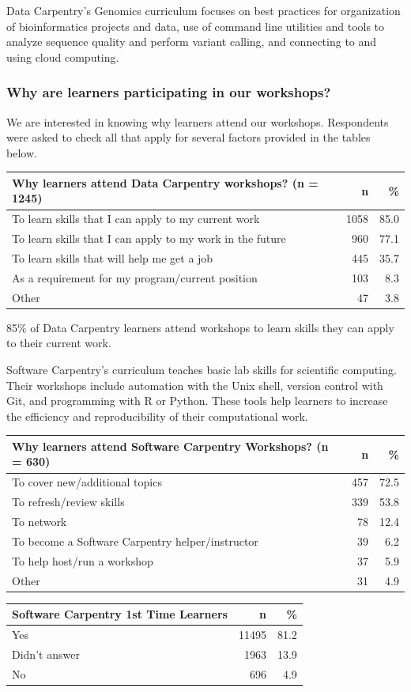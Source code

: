\documentclass[]{article}
\begin{document}
Data Carpentry's Genomics curriculum focuses on best practices for
organization of bioinformatics projects and data, use of command line
utilities and tools to analyze sequence quality and perform variant
calling, and connecting to and using cloud computing.

\subsubsection{Why are learners participating in our
workshops?}\label{why-are-learners-participating-in-our-workshops}

We are interested in knowing why learners attend our workshops.
Respondents were asked to check all that apply for several factors
provided in the tables below.

\begin{longtable}[]{@{}lrr@{}}
\toprule
Why learners attend Data Carpentry workshops? (n = 1245) & n &
\%\tabularnewline
\midrule
\endhead
To learn skills that I can apply to my current work & 1058 &
85.0\tabularnewline
To learn skills that I can apply to my work in the future & 960 &
77.1\tabularnewline
To learn skills that will help me get a job & 445 & 35.7\tabularnewline
As a requirement for my program/current position & 103 &
8.3\tabularnewline
Other & 47 & 3.8\tabularnewline
\bottomrule
\end{longtable}

85\% of Data Carpentry learners attend workshops to learn skills they
can apply to their current work.

Software Carpentry's curriculum teaches basic lab skills for scientific
computing. Their workshops include automation with the Unix shell,
version control with Git, and programming with R or Python. These tools
help learners to increase the efficiency and reproducibility of their
computational work.

\begin{longtable}[]{@{}lrr@{}}
\toprule
Why learners attend Software Carpentry Workshops? (n = 630) & n &
\%\tabularnewline
\midrule
\endhead
To cover new/additional topics & 457 & 72.5\tabularnewline
To refresh/review skills & 339 & 53.8\tabularnewline
To network & 78 & 12.4\tabularnewline
To become a Software Carpentry helper/instructor & 39 &
6.2\tabularnewline
To help host/run a workshop & 37 & 5.9\tabularnewline
Other & 31 & 4.9\tabularnewline
\bottomrule
\end{longtable}

\begin{longtable}[]{@{}lrr@{}}
\toprule
Software Carpentry 1st Time Learners & n & \%\tabularnewline
\midrule
\endhead
Yes & 11495 & 81.2\tabularnewline
Didn't answer & 1963 & 13.9\tabularnewline
No & 696 & 4.9\tabularnewline
\bottomrule
\end{longtable}
\end{document}

